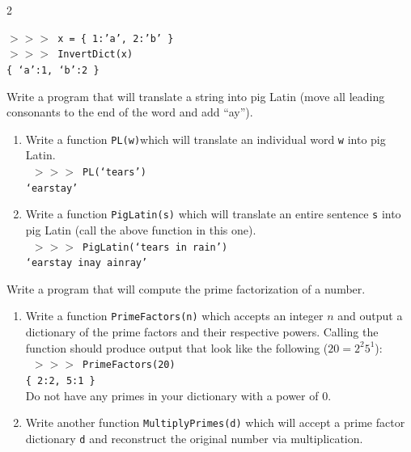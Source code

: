 \documentclass[12pt]{article}%
\newcommand{\code}[1]{\texttt{#1}}
\newcommand{\shp}{$>>>$ }
\begin{document}
\begin{multicols*}{2}
\begin{Exercise}[origin={10 points, Python}]
\code{\shp x = \{ 1:'a', 2:'b' \} \\
\shp InvertDict(x) \\
\{ `a':1, `b':2 \}
}

\end{Exercise}

\vfill\null

\begin{Exercise}[origin={15 points, Python}]

Write a program that will translate a string into pig Latin (move all leading consonants to the end of the word and add ``ay'').
\begin{enumerate}
	\item Write a function \code{PL(w)}which will translate an individual word \code{w} into pig Latin. \\
	\code{ \shp PL(`tears') \\
	`earstay'
	}
	\item Write a function \code{PigLatin(s)} which will translate an entire sentence \code{s} into pig Latin (call the above function in this one). \\
	\code{ \shp PigLatin(`tears in rain') \\
	`earstay inay ainray'
	}
\end{enumerate}

\end{Exercise}

\begin{Exercise}[origin={20 points, Python}]

Write a program that will compute the prime factorization of a number.
\begin{enumerate}
	\item Write a function \code{PrimeFactors(n)} which accepts an integer $n$ and output a dictionary of the prime factors and their respective powers. Calling the function should produce output that look like the following ($20 = 2^2 5^1$): \\
	\code{ \shp PrimeFactors(20) \\
	\{ 2:2, 5:1 \}
	} \\
	Do not have any primes in your dictionary with a power of 0.
	\item Write another function \code{MultiplyPrimes(d)} which will accept a prime factor dictionary \code{d} and reconstruct the original number via multiplication.
\end{enumerate}

\end{Exercise}

\end{multicols*}
\end{document}

